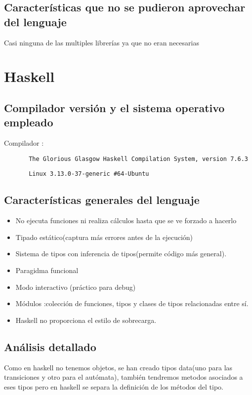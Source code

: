 \documentclass[12pt,a4paper]{article}
\begin{document}
    \subsection{Características que no se pudieron aprovechar del lenguaje}
    Casi ninguna de las multiples librerías ya que no eran necesarias
     \section{Haskell}
       \subsection{Compilador versión y el sistema operativo empleado}
       Compilador :
       \begin{lstlisting}
       The Glorious Glasgow Haskell Compilation System, version 7.6.3
       \end{lstlisting}
       \begin{lstlisting}
       Linux 3.13.0-37-generic #64-Ubuntu
       \end{lstlisting}
       \subsection{Características generales del lenguaje}
        \begin{itemize}
       	\item No ejecuta funciones ni realiza cálculos hasta que se ve forzado a hacerlo
        \item Tipado estático(captura más errores antes de la ejecución)
        \item Sistema de tipos con inferencia de tipos(permite código más general).
        \item Paragidma funcional
        \item Modo interactivo (práctico para debug)
        \item Módulos :colección de funciones, tipos y clases de tipos relacionadas entre sí.
        \item Haskell no proporciona el estilo de sobrecarga.
       \end{itemize}
       \subsection{Análisis detallado}
        Como en haskell no tenemos objetos, se han creado tipos data(uno para las transiciones y otro para el autómata), también tendremos metodos asociados a eses tipos pero en haskell se separa la definición de los métodos del tipo.
        
\end{document}
